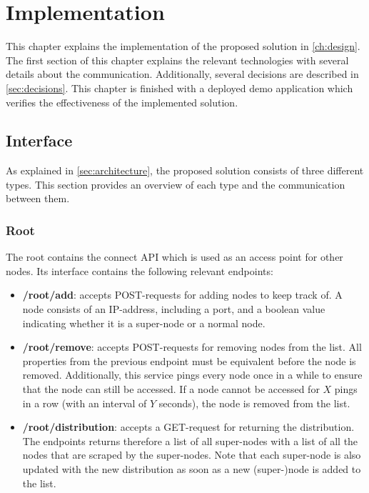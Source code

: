 \chapter{Implementation}\label{ch:implementation}
This chapter explains the implementation of the proposed solution in \autoref{ch:design}. The first section of this chapter explains the relevant technologies with several details about the communication. Additionally, several decisions are described in \autoref{sec:decisions}. This chapter is finished with a deployed demo application which verifies the effectiveness of the implemented solution.

\section{Interface} \label{sec:interface}
As explained in \autoref{sec:architecture}, the proposed solution consists of three different types. This section provides an overview of each type and the communication between them.

\subsection{Root} \label{sec:impl-root}
The root contains the connect API which is used as an access point for other nodes. Its interface contains the following relevant endpoints:

\begin{itemize}
    \item \textbf{/root/add}: accepts POST-requests for adding nodes to keep track of. A node consists of an IP-address, including a port, and a boolean value indicating whether it is a super-node or a normal node.
    \item \textbf{/root/remove}: accepts POST-requests for removing nodes from the list. All properties from the previous endpoint must be equivalent before the node is removed. Additionally, this service pings every node once in a while to ensure that the node can still be accessed. If a node cannot be accessed for $X$ pings in a row (with an interval of $Y$ seconds), the node is removed from the list.
    \item \textbf{/root/distribution}: accepts a GET-request for returning the distribution. The endpoints returns therefore a list of all super-nodes with a list of all the nodes that are scraped by the super-nodes. Note that each super-node is also updated with the new distribution as soon as a new (super-)node is added to the list. 
\end{itemize}

